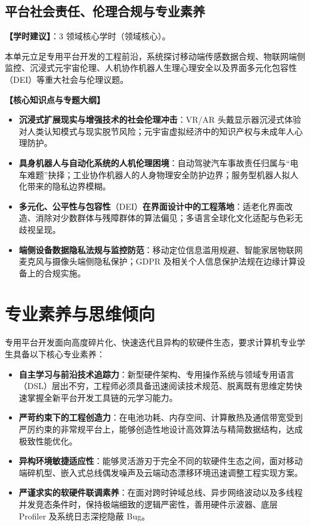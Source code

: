 \subsection{平台社会责任、伦理合规与专业素养}
\textbf{【学时建议】}：3 领域核心学时（领域核心）。

本单元立足专用平台开发的工程前沿，系统探讨移动端传感数据合规、物联网端侧监控、沉浸式元宇宙伦理、人机协作机器人生理心理安全以及界面多元化包容性（DEI）等重大社会与伦理议题。

\textbf{【核心知识点与专题大纲】}
\begin{itemize}
    \item \textbf{沉浸式扩展现实与增强技术的社会伦理冲击}：VR/AR 头戴显示器沉浸式体验对人类认知模式与现实脱节风险；元宇宙虚拟经济中的知识产权与未成年人心理防护。
    \item \textbf{具身机器人与自动化系统的人机伦理困境}：自动驾驶汽车事故责任归属与“电车难题”抉择；工业协作机器人的人身物理安全防护边界；服务型机器人拟人化带来的隐私边界模糊。
    \item \textbf{多元化、公平性与包容性}（DEI）\textbf{在界面设计中的工程落地}：适老化界面改造、消除对少数群体与残障群体的算法偏见；多语言全球化文化适配与色彩无歧视呈现。
    \item \textbf{端侧设备数据隐私法规与监控防范}：移动定位信息滥用规避、智能家居物联网麦克风与摄像头端侧隐私保护；GDPR 及相关个人信息保护法规在边缘计算设备上的合规实施。
\end{itemize}

\section{专业素养与思维倾向}

专用平台开发面向高度碎片化、快速迭代且异构的软硬件生态，要求计算机专业学生具备以下核心专业素养：
\begin{itemize}
    \item \textbf{自主学习与前沿技术追踪力}：新型硬件架构、专用操作系统与领域专用语言（DSL）层出不穷，工程师必须具备迅速阅读技术规范、脱离既有思维定势快速掌握全新平台开发工具链的元学习能力。
    \item \textbf{严苛约束下的工程创造力}：在电池功耗、内存空间、计算散热及通信带宽受到严厉约束的非常规平台上，能够创造性地设计高效算法与精简数据结构，达成极致性能优化。
    \item \textbf{异构环境敏捷适应性}：能够灵活游刃于完全不同的软硬件生态之间，面对移动端碎机型、嵌入式总线偶发噪声及云端动态漂移环境迅速调整工程实现方案。
    \item \textbf{严谨求实的软硬件联调素养}：在面对跨时钟域总线、异步网络波动以及多线程并发竞态条件时，保持极端细致的逻辑严密性，善用硬件示波器、底层 Profiler 及系统日志深挖隐蔽 Bug。
\end{itemize}

